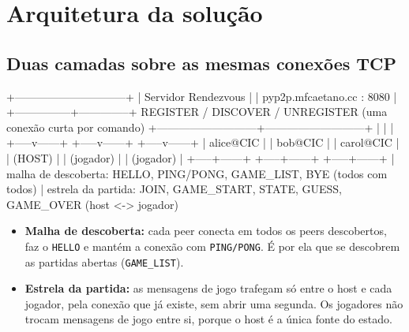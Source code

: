 \documentclass[11pt,a4paper]{article}
\begin{document}
\section{Arquitetura da solução}

\subsection{Duas camadas sobre as mesmas conexões TCP}
\begin{codigo}
                    +------------------------------+
                    |  Servidor Rendezvous         |
                    |  pyp2p.mfcaetano.cc : 8080   |
                    +---------------+--------------+
        REGISTER / DISCOVER / UNREGISTER  (uma conexão curta por comando)
        +---------------------------+---------------------------+
        |                           |                           |
  +-----v------+              +-----v------+              +-----v------+
  | alice@CIC  |              |  bob@CIC   |              | carol@CIC  |
  |   (HOST)   |              | (jogador)  |              | (jogador)  |
  +-----+------+              +-----+------+              +-----+------+
        |  malha de descoberta: HELLO, PING/PONG, GAME_LIST, BYE (todos com todos)
        |  estrela da partida:  JOIN, GAME_START, STATE, GUESS, GAME_OVER (host <-> jogador)
\end{codigo}
\begin{itemize}
\item \textbf{Malha de descoberta:} cada peer conecta em todos os peers descobertos, faz o \texttt{HELLO} e mantém a conexão com \texttt{PING/PONG}. É por ela que se descobrem as partidas abertas (\texttt{GAME\_LIST}).
\item \textbf{Estrela da partida:} as mensagens de jogo trafegam só entre o host e cada jogador, pela conexão que já existe, sem abrir uma segunda. Os jogadores não trocam mensagens de jogo entre si, porque o host é a única fonte do estado.
\end{itemize}
\end{document}
